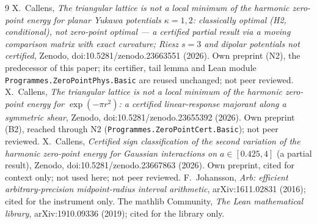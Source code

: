 \documentclass[11pt]{article}
\begin{document}
\begin{thebibliography}{9}
 X.~Callens, \emph{The triangular lattice is not a local minimum of the harmonic zero-point energy for planar Yukawa potentials $\kappa=1,2$: classically optimal (H2, conditional), not zero-point optimal --- a certified partial result via a moving comparison matrix with exact curvature; Riesz $s=3$ and dipolar potentials not certified}, Zenodo, doi:10.5281/zenodo.23663551 (2026). Own preprint (N2), the predecessor of this paper; its certifier, tail lemma and Lean module \texttt{Programmes.ZeroPointPhys.Basic} are reused unchanged; not peer reviewed.
 X.~Callens, \emph{The triangular lattice is not a local minimum of the harmonic zero-point energy for $\exp(-\pi r^2)$: a certified linear-response majorant along a symmetric shear}, Zenodo, doi:10.5281/zenodo.23655392 (2026). Own preprint (B2), reached through N2 (\texttt{Programmes.ZeroPointCert.Basic}); not peer reviewed.
 X.~Callens, \emph{Certified sign classification of the second variation of the harmonic zero-point energy for Gaussian interactions on $a\in[0.425,4]$} (a partial result), Zenodo, doi:10.5281/zenodo.23667863 (2026). Own preprint, cited for context only; not used here; not peer reviewed.
 F.~Johansson, \emph{Arb: efficient arbitrary-precision midpoint-radius interval arithmetic}, arXiv:1611.02831 (2016); cited for the instrument only.
 The mathlib Community, \emph{The Lean mathematical library}, arXiv:1910.09336 (2019); cited for the library only.
\end{thebibliography}
\end{document}
